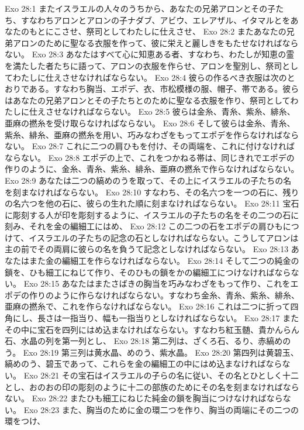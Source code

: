 Exo 28:1  またイスラエルの人々のうちから、あなたの兄弟アロンとその子たち、すなわちアロンとアロンの子ナダブ、アビウ、エレアザル、イタマルとをあなたのもとにこさせ、祭司としてわたしに仕えさせ、
Exo 28:2  またあなたの兄弟アロンのために聖なる衣服を作って、彼に栄えと麗しきをもたせなければならない。
Exo 28:3  あなたはすべて心に知恵ある者、すなわち、わたしが知恵の霊を満たした者たちに語って、アロンの衣服を作らせ、アロンを聖別し、祭司としてわたしに仕えさせなければならない。
Exo 28:4  彼らの作るべき衣服は次のとおりである。すなわち胸当、エポデ、衣、市松模様の服、帽子、帯である。彼らはあなたの兄弟アロンとその子たちとのために聖なる衣服を作り、祭司としてわたしに仕えさせなければならない。
Exo 28:5  彼らは金糸、青糸、紫糸、緋糸、亜麻の撚糸を受け取らなければならない。
Exo 28:6  そして彼らは金糸、青糸、紫糸、緋糸、亜麻の撚糸を用い、巧みなわざをもってエポデを作らなければならない。
Exo 28:7  これに二つの肩ひもを付け、その両端を、これに付けなければならない。
Exo 28:8  エポデの上で、これをつかねる帯は、同じきれでエポデの作りのように、金糸、青糸、紫糸、緋糸、亜麻の撚糸で作らなければならない。
Exo 28:9  あなたは二つの縞めのうを取って、その上にイスラエルの子たちの名を刻まなければならない。
Exo 28:10  すなわち、その名六つを一つの石に、残りの名六つを他の石に、彼らの生れた順に刻まなければならない。
Exo 28:11  宝石に彫刻する人が印を彫刻するように、イスラエルの子たちの名をその二つの石に刻み、それを金の編細工にはめ、
Exo 28:12  この二つの石をエポデの肩ひもにつけて、イスラエルの子たちの記念の石としなければならない。こうしてアロンは主の前でその両肩に彼らの名を負うて記念としなければならない。
Exo 28:13  あなたはまた金の編細工を作らなければならない。
Exo 28:14  そして二つの純金の鎖を、ひも細工にねじて作り、そのひもの鎖をかの編細工につけなければならない。
Exo 28:15  あなたはまたさばきの胸当を巧みなわざをもって作り、これをエポデの作りのように作らなければならない。すなわち金糸、青糸、紫糸、緋糸、亜麻の撚糸で、これを作らなければならない。
Exo 28:16  これは二つに折って四角にし、長さは一指当り、幅も一指当りとしなければならない。
Exo 28:17  またその中に宝石を四列にはめ込まなければならない。すなわち紅玉髄、貴かんらん石、水晶の列を第一列とし、
Exo 28:18  第二列は、ざくろ石、るり、赤縞めのう。
Exo 28:19  第三列は黄水晶、めのう、紫水晶。
Exo 28:20  第四列は黄碧玉、縞めのう、碧玉であって、これらを金の編細工の中にはめ込まなければならない。
Exo 28:21  その宝石はイスラエルの子らの名に従い、その名とひとしく十二とし、おのおの印の彫刻のように十二の部族のためにその名を刻まなければならない。
Exo 28:22  またひも細工にねじた純金の鎖を胸当につけなければならない。
Exo 28:23  また、胸当のために金の環二つを作り、胸当の両端にその二つの環をつけ、
